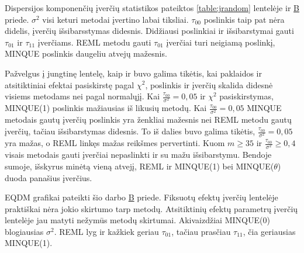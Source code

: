 \documentclass[12pt,a4paper]{article}
\begin{document}
\indent Dispersijos komponenčių įverčių statistikos pateiktos \ref{table:jrandom} lentelėje ir  \hyperlink{appendixb}{B} priede. $\sigma^2$ visi keturi metodai įvertino labai tiksliai. $\tau_{00}$ poslinkis taip pat nėra didelis, įverčių išsibarsstymas didesnis. Didžiausi poslinkiai ir išsibarstymai gauti $\tau_{01}$ ir $\tau_{11}$ įverčiams. REML metodu gauti $\tau_{01}$ įverčiai turi neigiamą poslinkį, MINQUE poslinkis daugeliu atvejų mažesnis.

\indent Pažvelgus į jungtinę lentelę, kaip ir buvo galima tikėtis, kai paklaidos ir atsitiktiniai efektai pasiskirstę pagal $\chi^2$, poslinkis ir įverčių skalida didesnė visiems metodams nei pagal normalųjį. Kai $\frac{\tau_{00}}{\sigma^2}=0,05$ ir  $\chi^2$ pasiskirstymas, MINQUE(1) poslinkis mažiausias iš likusių metodų. Kai $\frac{\tau_{00}}{\sigma^2}=0,05$ MINQUE metodais gautų įverčių poslinkis yra ženkliai mažesnis nei REML metodu gautų įverčių, tačiau išsibarstymas didesnis.  To iš dalies buvo galima tikėtis, $\frac{\tau_{00}}{\sigma^2}=0,05$ yra mažas, o REML linkęs mažas reikšmes pervertinti. Kuom $m \geq 35$ ir $\frac{\tau_{00}}{\sigma^2}\geq 0,4$ visais metodais gauti įverčiai nepaslinkti ir su mažu išsibarstymu. Bendoje sumoje, išskyrus minėtą vieną atvejį, REML ir MINQUE(1) bei MINQUE($\theta$) duoda panašius įverčius.


\indent EQDM grafikai pateikti šio darbo \hyperlink{appendixb}{B} priede. Fiksuotų efektų įverčių lentelėje praktiškai nėra jokio skirtumo tarp metodų. Atsitiktinių efektų parametrų įverčių lentelėje jau matyti nežymūs metodų skirtumai. Akivaizdžiai MINQUE(0) blogiausias $\sigma^2$. REML lyg ir kažkiek geriau $\tau_{01}$, tačiau prasčiau $\tau_{11}$, čia geriausias MINQUE(1). 
\end{document}
